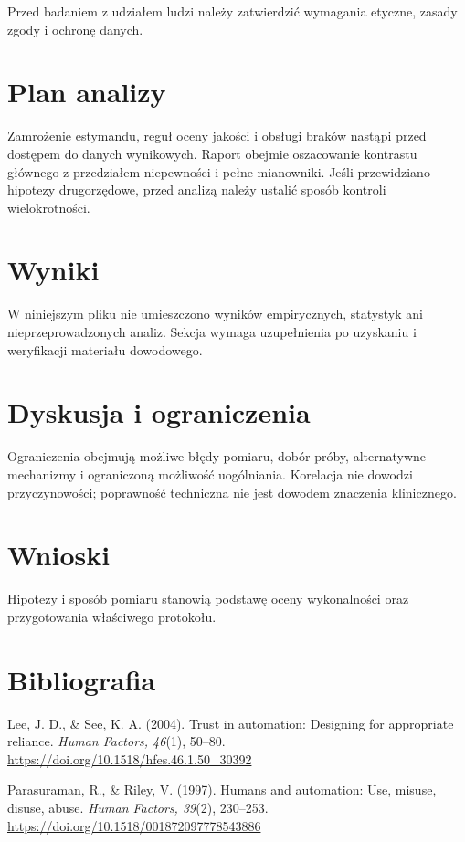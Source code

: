 \documentclass[11pt,a4paper]{article}
\begin{document}
Przed badaniem z udziałem ludzi należy zatwierdzić wymagania etyczne, zasady zgody i ochronę danych.

\section{Plan analizy}

Zamrożenie estymandu, reguł oceny jakości i obsługi braków nastąpi przed dostępem do danych wynikowych. Raport obejmie oszacowanie kontrastu głównego z przedziałem niepewności i pełne mianowniki. Jeśli przewidziano hipotezy drugorzędowe, przed analizą należy ustalić sposób kontroli wielokrotności.

\section{Wyniki}

W niniejszym pliku nie umieszczono wyników empirycznych, statystyk ani nieprzeprowadzonych analiz. Sekcja wymaga uzupełnienia po uzyskaniu i weryfikacji materiału dowodowego.

\section{Dyskusja i ograniczenia}

Ograniczenia obejmują możliwe błędy pomiaru, dobór próby, alternatywne mechanizmy i ograniczoną możliwość uogólniania. Korelacja nie dowodzi przyczynowości; poprawność techniczna nie jest dowodem znaczenia klinicznego.

\section{Wnioski}

Hipotezy i sposób pomiaru stanowią podstawę oceny wykonalności oraz przygotowania właściwego protokołu.

\section*{Bibliografia}

{\setlength{\parindent}{0pt}
\setlength{\parskip}{5pt}
\hangindent=1.27cm
Lee, J. D., \& See, K. A. (2004). Trust in automation: Designing for appropriate reliance. \textit{Human Factors, 46}(1), 50--80. \url{https://doi.org/10.1518/hfes.46.1.50_30392}\par
\hangindent=1.27cm
Parasuraman, R., \& Riley, V. (1997). Humans and automation: Use, misuse, disuse, abuse. \textit{Human Factors, 39}(2), 230--253. \url{https://doi.org/10.1518/001872097778543886}\par
}
\end{document}
